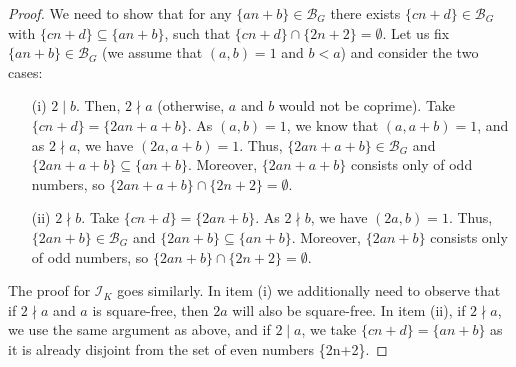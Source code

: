 \documentclass{amsart}
\theoremstyle{definition}
\theoremstyle{definition}
\newcommand{\I}{\mathcal I}
\begin{document}
\begin{proof}
We need to show that for any $\{an+b\} \in \mathcal{B}_G$ there exists $\{cn+d\} \in \mathcal{B}_G$ with $\{cn+d\} \subseteq \{an+b\}$, such that $\{cn+d\}\cap \{2n+2\} = \emptyset$. Let us fix $\{an+b\} \in \mathcal{B}_G$ (we assume that $(a,b)=1$ and $b<a$) and consider the two cases:
\begin{itemize}
 \item[(i)] $2\mid b$. Then, $2 \nmid a$ (otherwise, $a$ and $b$ would not be coprime). Take $\{cn+d\} = \{2an+a+b\}$. As $(a,b)=1$, we know that $(a,a+b)=1$, and as $2 \nmid a$, we have $(2a,a+b)=1$. Thus, $\{2an+a+b\}\in\mathcal{B}_G$ and $\{2an+a+b\}\subseteq\{an+b\}$. Moreover, $\{2an+a+b\}$ consists only of odd numbers, so $\{2an+a+b\}\cap \{2n+2\} = \emptyset$.
 \item[(ii)] $2\nmid b$. Take $\{cn+d\} = \{2an+b\}$. As $2\nmid b$, we have $(2a,b)=1$. Thus, $\{2an+b\}\in\mathcal{B}_G$ and $\{2an+b\}\subseteq\{an+b\}$. Moreover, $\{2an+b\}$ consists only of odd numbers, so $\{2an+b\}\cap \{2n+2\} = \emptyset$.
\end{itemize}

The proof for $\I_K$ goes similarly. In item (i) we additionally need to observe that if $2 \nmid a$ and $a$ is square-free, then $2a$ will also be square-free. In item (ii), if $2 \nmid a$, we use the same argument as above, and if $2\mid a$, we take $\{cn+d\} = \{an+b\}$ as it is already disjoint from the set of even numbers \{2n+2\}.
\end{proof}
\end{document}
